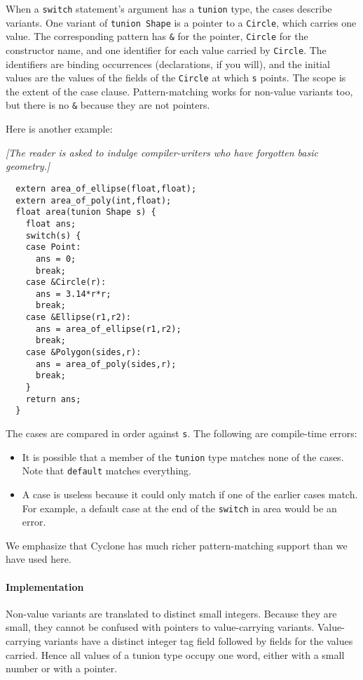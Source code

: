 When a \texttt{switch} statement's argument has a \texttt{tunion} type,
the cases describe variants.  One variant of \texttt{tunion Shape} is a
pointer to a \texttt{Circle}, which carries one value.  The
corresponding pattern has \texttt{\&} for the pointer, \texttt{Circle} for
the constructor name, and one identifier for each value carried by
\texttt{Circle}.  The identifiers are binding occurrences (declarations,
if you will), and the initial values are the values of the fields of
the \texttt{Circle} at which \texttt{s} points.  The scope is the extent
of the case clause.  Pattern-matching works for non-value variants
too, but there is no \texttt{\&} because they are not pointers.

Here is another example:

\textit{[The reader is asked to indulge compiler-writers who have
  forgotten basic geometry.]}
\begin{verbatim}
  extern area_of_ellipse(float,float);
  extern area_of_poly(int,float);
  float area(tunion Shape s) {
    float ans;
    switch(s) {
    case Point:
      ans = 0;
      break;
    case &Circle(r):
      ans = 3.14*r*r;
      break;
    case &Ellipse(r1,r2):
      ans = area_of_ellipse(r1,r2);
      break;
    case &Polygon(sides,r):
      ans = area_of_poly(sides,r);
      break;
    }
    return ans;
  }
\end{verbatim}

The cases are compared in order against \texttt{s}.  The following are
compile-time errors:
\begin{itemize}
\item It is possible that a member of the \texttt{tunion} type matches
  none of the cases.  Note that \texttt{default} matches everything.
\item A case is useless because it could only match if one of the
  earlier cases match.  For example, a default case at the end of the
  \texttt{switch} in area would be an error.
\end{itemize}

We emphasize that Cyclone has much richer pattern-matching support
than we have used here.

\paragraph{Implementation}
Non-value variants are translated to distinct small integers.  Because
they are small, they cannot be confused with pointers to
value-carrying variants.  Value-carrying variants have a distinct
integer tag field followed by fields for the values carried.  Hence
all values of a tunion type occupy one word, either with a small
number or with a pointer.


